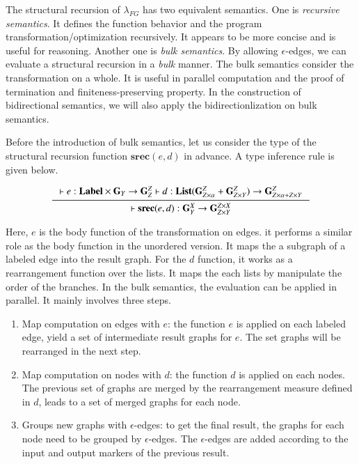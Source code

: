 \documentclass{llncs}
\begin{document}
The structural recursion of $\lambda_{FG}$ has two equivalent semantics. One is \emph{recursive semantics}. It defines the function behavior and the program transformation/optimization recursively. It appears to be more concise and is useful for reasoning. Another one is \emph{bulk semantics}. By allowing $\epsilon$-edges, we can evaluate a structural recursion in a \emph{bulk} manner. The bulk semantics consider the transformation on a whole. It is useful in parallel computation and the proof of termination and finiteness-preserving property. In the construction of bidirectional semantics, we will also apply the bidirectionlization on bulk semantics.

Before the introduction of bulk semantics, let us consider the type of the structural recursion function $\mathbf{srec}(e,d)$ in advance. A type inference rule is given below.

$$\inference{\vdash e:\mathbf{Label}\times\mathbf{G}_Y\rightarrow\mathbf{G}^Z_Z \vdash d:\mathbf{List}(\mathbf{G}^Z_{Z\times\alpha}+\mathbf{G}^Z_{Z\times Y})\rightarrow\mathbf{G}^Z_{Z\times\alpha+Z\times Y}}{\vdash\mathbf{srec}(e,d):\mathbf{G}^X_Y\rightarrow\mathbf{G}^{Z\times X}_{Z\times Y}}$$

Here, $e$ is the body function of the transformation on edges. it performs a similar role as the body function in the unordered version. It maps the a subgraph of a labeled edge into the result graph. For the $d$ function, it works as a rearrangement function over the lists. It maps the each lists by manipulate the order of the branches. In the bulk semantics, the evaluation can be applied in parallel. It mainly involves three steps.
\begin{enumerate}
	\item Map computation on edges with $e$: the function $e$ is applied on each labeled edge, yield a set of intermediate result graphs for $e$. The set graphs will be rearranged in the next step.
	\item Map computation on nodes with $d$: the function $d$ is applied on each nodes. The previous set of graphs are merged by the rearrangement measure defined in $d$, leads to a set of merged graphs for each node.
	\item Groups new graphs with $\epsilon$-edges: to get the final result, the graphs for each node need to be grouped by $\epsilon$-edges. The $\epsilon$-edges are added according to the input and output markers of the previous result. 
\end{enumerate}
\end{document}
